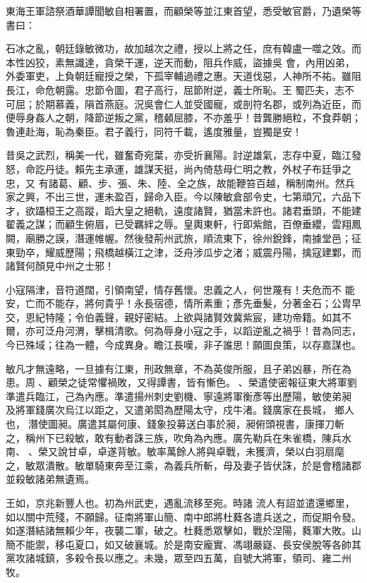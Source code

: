 \begin{pinyinscope}
 東海王軍諮祭酒華譚聞敏自相署置，而顧榮等並江東首望，悉受敏官爵，乃遺榮等書曰：



 石冰之亂，朝廷錄敏微功，故加越次之禮，授以上將之任，庶有韓盧一噬之效。而本性凶狡，素無識達，貪榮干運，逆天而動，阻兵作威，盜據吳
 會，內用凶弟，外委軍吏，上負朝廷寵授之榮，下孤宰輔過禮之惠。天道伐惡，人神所不祐。雖阻長江，命危朝露。忠節令圖，君子高行，屈節附逆，義士所恥。王蜀匹夫，志不可屈；於期慕義，隕首燕庭。況吳會仁人並受國寵，或剖符名郡，或列為近臣，而便辱身姦人之朝，降節逆叛之黨，稽顙屈膝，不亦羞乎！昔龔勝絕粒，不食莽朝；魯連赴海，恥為秦臣。君子義行，同符千載，遙度雅量，豈獨是安！



 昔吳之武烈，稱美一代，雖奮奇宛葉，亦受折襄陽。討逆雄氣，志存中夏，臨江發怒，命訖丹徒。賴先主承運，雄謀天挺，尚內倚慈母仁明之教，外杖子布廷爭之忠，又
 有諸葛、顧、步、張、朱、陸、全之族，故能鞭笞百越，稱制南州。然兵家之興，不出三世，運未盈百，歸命入臣。今以陳敏倉部令史，七第頑冗，六品下才，欲躡桓王之高蹤，蹈大皇之絕軌，遠度諸賢，猶當未許也。諸君垂頭，不能建翟義之謀；而顧生俯眉，已受羈絆之辱。皇輿東軒，行即紫館，百僚垂纓，雲翔鳳闕，廟勝之謨，潛運帷幄。然後發荊州武旅，順流東下，徐州銳鋒，南據堂邑；征東勁卒，耀威歷陽；飛橋越橫江之津，泛舟涉瓜步之渚；威震丹陽，擒寇建鄴，而諸賢何顏見中州之士邪！



 小寇隔津，音符道闊，引領南望，情存舊懷。忠義之人，何世蔑有！夫危而不
 能安，亡而不能存，將何貴乎！永長宿德，情所素重；彥先垂髮，分著金石；公胄早交，恩紀特隆；令伯義聲，親好密結。上欲與諸賢效冀紫宸，建功帝籍。如其不爾，亦可泛舟河渭，擊楫清歌。何為辱身小寇之手，以蹈逆亂之禍乎！昔為同志，今已殊域；往為一體，今成異身。瞻江長嘆，非子誰思！願圖良策，以存嘉謀也。



 敏凡才無遠略，一旦據有江東，刑政無章，不為英俊所服，且子弟凶暴，所在為患。周、顧榮之徒常懼禍敗，又得譚書，皆有慚色。、榮遣使密報征東大將軍劉準遣兵臨江，己為內應。準遣揚州刺史劉機、寧遠將軍衡彥等出歷陽，敏使弟昶
 及將軍錢廣次烏江以距之，又遣弟閎為歷陽太守，戍牛渚。錢廣家在長城，鄉人也，潛使圖昶。廣遣其屬何康、錢象投募送白事於昶，昶俯頭視書，康揮刀斬之，稱州下已殺敏，敢有動者誅三族，吹角為內應。廣先勒兵在朱雀橋，陳兵水南、、榮又說甘卓，卓遂背敏。敏率萬餘人將與卓戰，未獲濟，榮以白羽扇麾之，敏眾潰散。敏單騎東奔至江乘，為義兵所斬，母及妻子皆伏誅，於是會稽諸郡並殺敏諸弟無遺焉。



 王如，京兆新豐人也。初為州武吏，遇亂流移至宛。時諸
 流人有詔並遣還鄉里，如以關中荒殘，不願歸。征南將軍山簡、南中郎將杜蕤各遣兵送之，而促期令發。如遂潛結諸無賴少年，夜襲二軍，破之。杜蕤悉眾擊如，戰於涅陽，蕤軍大敗。山簡不能禦，移屯夏口，如又破襄城。於是南安龐實、馮翊嚴嶷、長安侯脫等各帥其黨攻諸城鎮，多殺令長以應之。未幾，眾至四五萬，自號大將軍，領司、雍二州牧。




\end{pinyinscope}
